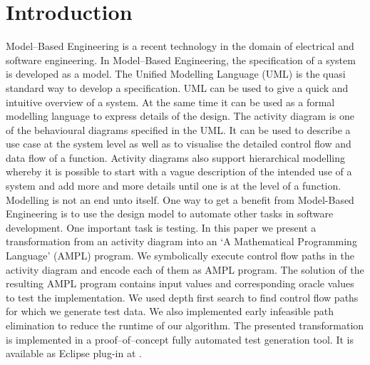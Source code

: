 \documentclass[runningheads,a4paper]{llncs}%
\begin{document}
\section{Introduction}%
Model--Based Engineering is a recent technology in the domain of electrical and software engineering. In Model--Based Engineering, the specification of a system is developed as a model. The Unified Modelling Language\textsuperscript{\texttrademark} (UML) is the quasi standard way to develop a specification. UML can be used to give a quick and intuitive overview of a system. At the same time it can be used as a formal modelling language to express details of the design. The activity diagram is one of the behavioural diagrams specified in the UML. It can be used to describe a use case at the system level as well as to visualise the detailed control flow and data flow of a function. Activity diagrams also support hierarchical modelling whereby it is possible to start with a vague description of the intended use of a system and add more and more details until one is at the level of a function.\\%
Modelling is not an end unto itself. One way to get a benefit from Model-Based Engineering is to use the design model to automate other tasks in software development. One important task is testing.
In this paper we present a transformation from an activity diagram into an `A Mathematical Programming Language' (AMPL) program. We symbolically execute control flow paths in the activity diagram and encode each of them as AMPL program. The solution of the resulting AMPL program contains input values and corresponding oracle values to test the implementation. We used depth first search to find control flow paths for which we generate test data. We also implemented early infeasible path elimination to reduce the runtime of our algorithm. %
The presented transformation is implemented in a proof--of--concept fully automated test generation tool. It is available as Eclipse plug-in at \cite{PartegWebsite}.\\%
\end{document}
